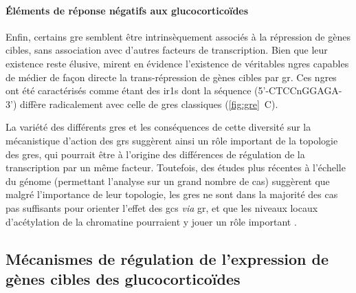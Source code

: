 \documentclass[../main.tex]{subfiles}
\begin{document}
\paragraph{Éléments de réponse négatifs aux glucocorticoïdes}
Enfin, certains \gls{gre} semblent être intrinsèquement associés à la répression de gènes cibles, sans association avec d'autres facteurs de transcription.
Bien que leur existence reste élusive, \citet{Surjit2011} mirent en évidence l'existence de véritables \glspl{ngre} capables de médier de façon directe la trans-répression de gènes cibles par \gls{gr}.
Ces \glspl{ngre} ont été caractérisés comme étant des \glspl{ir1} dont la séquence (5'-CTCCnGGAGA-3') diffère radicalement avec celle de \glspl{gre} classiques (\autoref{fig:gre}~C).
\\
\par
La variété des différents \glspl{gre} et les conséquences de cette diversité sur la mécanistique d'action des \glspl{gr} suggèrent ainsi un rôle important de la topologie des \glspl{gre}, qui pourrait être à l'origine des différences de régulation de la transcription par un même facteur.
Toutefois, des études plus récentes à l'échelle du génome (permettant l'analyse sur un grand nombre de cas) suggèrent que malgré l'importance de leur topologie, les \glspl{gre} ne sont dans la majorité des cas pas suffisants pour orienter l'effet des \glspl{gc} \textit{via} \gls{gr}, et que les niveaux locaux d'acétylation de la chromatine pourraient y jouer un rôle important \citep{Uhlenhaut2013}.


\subsection{Mécanismes de régulation de l'expression de gènes cibles des glucocorticoïdes}\label{subsec:meca-action-gc-via-gr}
\end{document}
